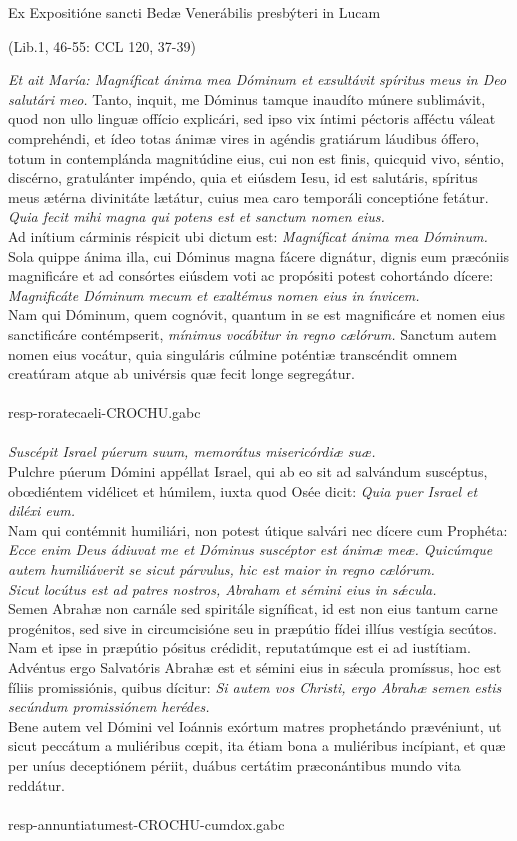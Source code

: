 \documentclass[options]{article}
\begin{document}
	Ex Expositióne sancti Bedæ Venerábilis presbýteri in Lucam
	\begin{flushright}
		(Lib.1, 46-55: CCL 120, 37-39)	
	\end{flushright}
\emph{Et ait María: Magníficat ánima mea Dóminum et exsultávit spíritus meus in Deo salutári meo.}
Tanto, inquit, me Dóminus tamque inaudíto múnere sublimávit, quod non ullo linguæ offício explicári, sed ipso vix íntimi péctoris afféctu váleat comprehéndi, et ídeo totas ánimæ vires in agéndis gratiárum láudibus óffero, totum in contemplánda magnitúdine eius, cui non est finis, quicquid vivo, séntio, discérno, gratulánter impéndo, quia et eiúsdem Iesu, id est salutáris, spíritus meus ætérna divinitáte lætátur, cuius mea caro temporáli conceptióne fetátur.\\
\emph{Quia fecit mihi magna qui potens est et sanctum nomen eius.}\\
Ad inítium cárminis réspicit ubi dictum est: \emph{Magníficat ánima mea Dóminum. } Sola quippe ánima illa, cui Dóminus magna fácere dignátur, dignis eum præcóniis magnificáre et ad consórtes eiúsdem voti ac propósiti potest cohortándo dícere: \emph{Magnificáte Dóminum mecum et exaltémus nomen eius in ínvicem.}\\
Nam qui Dóminum, quem cognóvit, quantum in se est magnificáre et nomen eius sanctificáre contémpserit, \textit{mínimus vocábitur in regno cælórum.} Sanctum autem nomen eius vocátur, quia singuláris cúlmine poténtiæ transcéndit omnem creatúram atque ab univérsis quæ fecit longe segregátur.\\
\\
resp-roratecaeli-CROCHU.gabc\\
\\
\emph{Suscépit Israel púerum suum, memorátus misericórdiæ suæ.}\\
Pulchre púerum Dómini appéllat Israel, qui ab eo sit ad salvándum suscéptus, obœdiéntem vidélicet et húmilem, iuxta quod Osée dicit: \emph{Quia puer Israel et diléxi eum.}\\
Nam qui contémnit humiliári, non potest útique salvári nec dícere cum Prophéta:
\emph{Ecce enim Deus ádiuvat me et Dóminus suscéptor est ánimæ meæ. Quicúmque autem humiliáverit se sicut párvulus, hic est maior in regno cælórum.}\\
\emph{Sicut locútus est ad patres nostros, Abraham et sémini eius in s\'{æ}cula.}\\
Semen Abrahæ non carnále sed spiritále signíficat, id est non eius tantum carne progénitos, sed sive in circumcisióne seu in præpútio fídei illíus vestígia secútos. Nam et ipse in præpútio pósitus crédidit, reputatúmque est ei ad iustítiam.\\
Advéntus ergo Salvatóris Abrahæ est et sémini eius in s\'{æ}cula promíssus, hoc est fíliis promissiónis, quibus dícitur: \emph{Si autem vos Christi, ergo Abrahæ semen estis secúndum promissiónem herédes.}\\
Bene autem vel Dómini vel Ioánnis exórtum matres prophetándo prævéniunt, ut sicut peccátum a muliéribus cœpit, ita étiam bona a muliéribus incípiant, et quæ per uníus deceptiónem périit, duábus certátim præconántibus mundo vita reddátur. \\
\\
resp-annuntiatumest-CROCHU-cumdox.gabc
	
\end{document}
